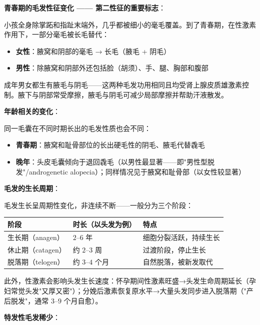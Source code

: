 \vspace{0.5em}
\noindent\textbf{青春期的毛发性征变化 —— 第二性征的重要标志}：

小孩全身除掌跖和指趾末端外，几乎都被细小的毫毛覆盖。到了青春期，在性激素作用下，一部分毫毛被长毛替代：
\begin{itemize}
	\item \textbf{女性}：腋窝和阴部的毫毛 → 长毛（腋毛 + 阴毛）
	\item \textbf{男性}：除腋窝和阴部外还包括脸（胡须）、手、腿、胸部和腹部
\end{itemize}

成年男女都生有腋毛与阴毛——这两种毛发功用相同且均受肾上腺皮质雄激素控制。腋下与阴部常受摩擦，腋毛与阴毛可减少局部摩擦并帮助汗液散发。

\vspace{0.5em}
\noindent\textbf{年龄相关的变化}：

同一毛囊在不同时期长出的毛发性质也会不同：
\begin{itemize}
	\item \textbf{青春期}：腋窝和耻骨部位的长出硬毛性的阴毛、腋毛代替毳毛
	\item \textbf{晚年}：头皮毛囊倾向于退回毳毛（以男性最显著——即"男性型脱发"/androgenetic alopecia）；同样情况见于腋窝和耻骨部（以女性较显著）
\end{itemize}

\vspace{0.5em}
\noindent\textbf{毛发的生长周期}：

毛发生长呈周期性变化，非连续不断——一般分为三个阶段：

\begin{center}\small
\begin{tabular}{|l|p{4cm}|p{5cm}|}
\hline
阶段 & 时长（以头发为例） & 特点 \\
\hline
生长期（anagen） & $2$--$6$ 年 & 细胞分裂活跃，持续生长 \\
休止期（catagen） & 约 $2$--$3$ 周 & 过渡阶段，停止生长 \\
脱落期（telogen） & 约 $3$--$4$ 个月 & 自然脱落，被新发取代 \\
\hline
\end{tabular}
\end{center}

此外，性激素会影响头发生长速度：怀孕期间性激素旺盛→头发生命周期延长（孕妇常觉头发"又厚又密"）；分娩后激素恢复原水平→大量头发同步进入脱落期（"产后脱发"，通常 $3$--$9$ 个月自愈）。

\vspace{0.5em}
\noindent\textbf{特发性毛发稀少}：

